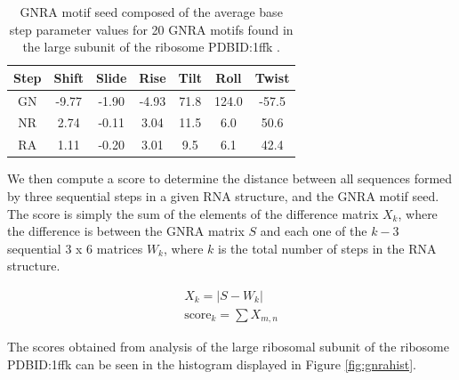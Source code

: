 \begin{table}[hb]  
\begin{center}
\begin{tabular}{|c|c|c|c|c|c|c|}
\hline
Step & Shift & Slide & Rise & Tilt & Roll & Twist \\
\hline
GN & -9.77 & -1.90 & -4.93 & 71.8 & 124.0 & -57.5 \\
NR & 2.74 & -0.11 & 3.04 & 11.5 & 6.0 & 50.6 \\
RA & 1.11 & -0.20 & 3.01 & 9.5 & 6.1 & 42.4 \\
\hline
\end{tabular}
\caption{GNRA motif  seed composed of the average  base step parameter
  values for 20 GNRA motifs found in the large subunit of the ribosome
  PDBID:1ffk \cite{lemieux2006}.}
\label{tab:seed}
\end{center}
\end{table}

We  then  compute  a  score  to determine  the  distance  between  all
sequences formed by  three sequential steps in a  given RNA structure,
and the GNRA  motif seed. The score is simply the  sum of the elements
of the difference matrix $X_{k}$,  where the difference is between the
GNRA matrix $S$ and each one of the $k-3$ sequential 3 x 6 matrices
$W_{k}$, where $k$ is the total number of steps in the RNA structure.

\begin{gather}
X_{k} = |S - W_{k}| \\
\text{score}_{k} = \sum X_{m,n} 
\end{gather}  

The scores  obtained from analysis  of the large ribosomal  subunit of
the  ribosome PDBID:1ffk  can be  seen in  the histogram  displayed in
Figure \ref{fig:gnrahist}.

